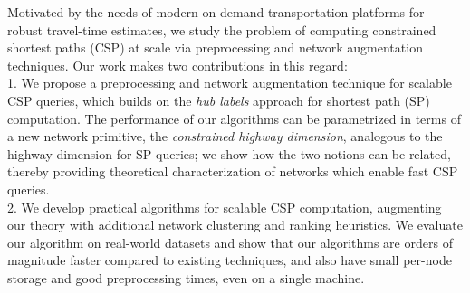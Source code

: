 Motivated by the needs of modern on-demand transportation platforms for robust travel-time estimates, we study the problem of computing constrained shortest paths (CSP) at scale via preprocessing and network augmentation techniques.
Our work makes two contributions in this regard:\\
1. We propose a preprocessing and network augmentation technique for scalable CSP queries, which builds on the \emph{hub labels} approach for shortest path (SP) computation.
The performance of our algorithms can be parametrized in terms of a new network primitive, the \emph{constrained highway dimension}, analogous to the highway dimension for SP queries;
we show how the two notions can be related, thereby providing theoretical characterization of networks which enable fast CSP queries.\\
2. We develop practical algorithms for scalable CSP computation, augmenting our theory with additional network clustering and ranking heuristics. We evaluate our algorithm on real-world datasets and show that our algorithms are orders of magnitude faster compared to existing techniques, and also have small per-node storage and good preprocessing times, even on a single machine.
